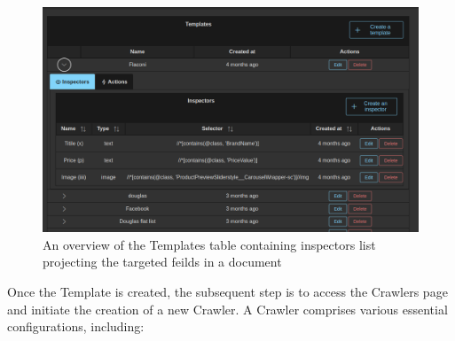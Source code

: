 \begin{figure}[h]	
     \centering
     \includegraphics[width=13cm]{figures/demo-3.png}
     \caption{An overview of the Templates table containing inspectors list projecting the targeted feilds in a document}
     \label{fig:templates-table}
\end{figure}

Once the Template is created, the subsequent step is to access the Crawlers page and initiate the creation of a new Crawler. A Crawler comprises various essential configurations, including:

